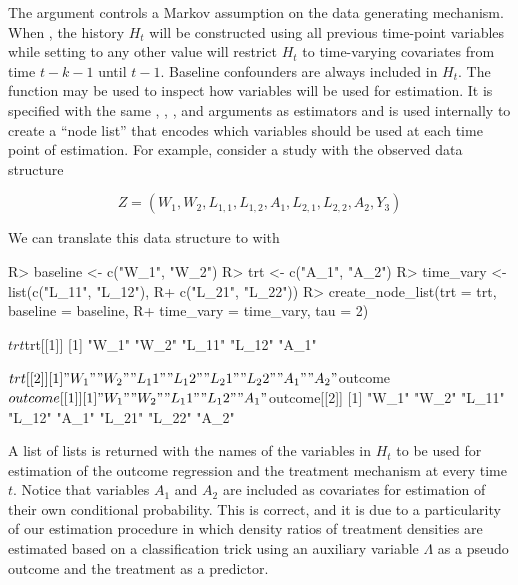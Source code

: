 \documentclass[]{jss}
\begin{document}
The  argument controls a Markov assumption on the data
generating mechanism. When , the history \(H_t\) will be
constructed using all previous time-point variables while setting
 to any other value
will restrict \(H_t\) to time-varying covariates from time \(t - k -
1\) until $t-1$.
Baseline confounders are always included in \(H_t\). The
 function may be used to inspect how variables
will be used for estimation. It is specified with the same ,
, , and  arguments as
 estimators and is used internally to create a ``node list''
that encodes which variables should be used at each time point of
estimation. For example, consider a study with the observed data
structure

\begin{equation}
Z = (W_1, W_2, L_{1, 1}, L_{1, 2}, A_1, L_{2, 1}, L_{2, 2}, A_2, Y_3)
\end{equation}

We can translate this data structure to  with

\begin{CodeChunk}

\begin{CodeInput}
R> baseline <- c("W_1", "W_2")
R> trt <- c("A_1", "A_2")
R> time_vary <- list(c("L_11", "L_12"), 
R+                   c("L_21", "L_22"))
R> create_node_list(trt = trt, baseline = baseline, 
R+                  time_vary = time_vary, tau = 2)
\end{CodeInput}

\begin{CodeOutput}
$trt
$trt[[1]]
[1] "W_1"  "W_2"  "L_11" "L_12" "A_1" 

$trt[[2]]
[1] "W_1"  "W_2"  "L_11" "L_12" "L_21" "L_22" "A_1"  "A_2" 


$outcome
$outcome[[1]]
[1] "W_1"  "W_2"  "L_11" "L_12" "A_1" 

$outcome[[2]]
[1] "W_1"  "W_2"  "L_11" "L_12" "A_1"  "L_21" "L_22" "A_2" 
\end{CodeOutput}
\end{CodeChunk}

A list of lists is returned with the names of the variables in \(H_t\)
to be used for estimation of the outcome regression and the treatment
mechanism at every time \(t\).  Notice that variables \(A_1\) and
\(A_2\) are included as covariates for estimation of their own
conditional probability. This is correct, and it is due to a
particularity of our estimation procedure in which density ratios of
treatment densities are estimated based on a classification trick
using an auxiliary variable \(\Lambda\) as a pseudo outcome and the
treatment as a predictor.
\end{document}
